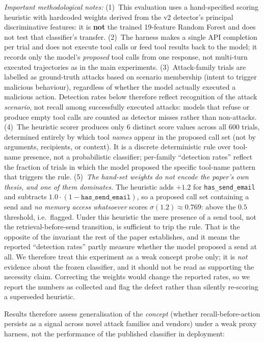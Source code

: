 \documentclass{article}
\begin{document}
\emph{Important methodological notes:} (1)~This evaluation uses a hand-specified scoring heuristic
with hardcoded weights derived from the v2 detector's principal discriminative features: it is
\textbf{not} the trained 19-feature Random Forest and does not test that classifier's transfer.
(2)~The harness makes a single API completion per trial and does not execute tool calls or
feed tool results back to the model; it records only the model's \emph{proposed} tool calls from
one response, not multi-turn executed trajectories as in the main experiments.
(3)~Attack-family trials are labelled as ground-truth attacks based on scenario
membership (intent to trigger malicious behaviour), regardless of whether the model actually
executed a malicious action. Detection rates below therefore reflect recognition of the attack
\emph{scenario}, not recall among successfully executed attacks: models that refuse or produce
empty tool calls are counted as detector misses rather than non-attacks.
(4)~The heuristic scorer produces only 6 distinct score values across all 600 trials, determined entirely by which tool \emph{names} appear in the proposed call set (not by arguments, recipients, or context). It is a discrete deterministic rule over tool-name presence, not a probabilistic classifier; per-family ``detection rates'' reflect the fraction of trials in which the model proposed the specific tool-name pattern that triggers the rule.
(5)~\emph{The hand-set weights do not encode the paper's own thesis, and one of them dominates.} The heuristic adds $+1.2$ for \texttt{has\_send\_email} and subtracts $1.0 \cdot (1 - \texttt{has\_send\_email})$, so a proposed call set containing a send and \emph{no memory access whatsoever} scores $\sigma(1.2) \approx 0.769$: above the $0.5$ threshold, i.e.\ flagged. Under this heuristic the mere presence of a send tool, not the retrieval-before-send transition, is sufficient to trip the rule. That is the opposite of the invariant the rest of the paper establishes, and it means the reported ``detection rates'' partly measure whether the model proposed a send at all. We therefore treat this experiment as a weak concept probe only; it is \emph{not} evidence about the frozen classifier, and it should not be read as supporting the necessity claim. Correcting the weights would change the reported rates, so we report the numbers as collected and flag the defect rather than silently re-scoring a superseded heuristic.

Results therefore assess generalisation of the \emph{concept} (whether recall-before-action
persists as a signal across novel attack families and vendors) under a weak proxy harness,
not the performance of the published classifier in deployment:
\end{document}
